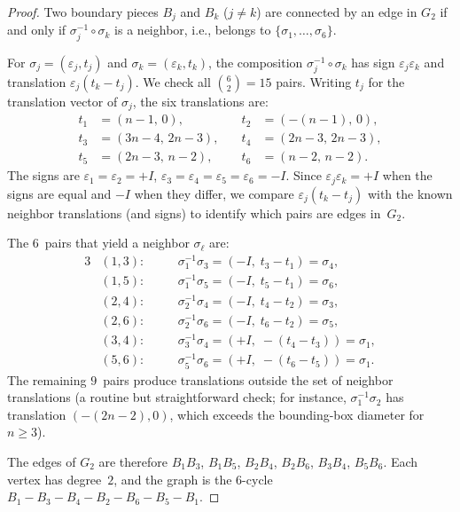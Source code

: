 \documentclass{amsart}
\theoremstyle{definition}
\theoremstyle{remark}
\begin{document}
\begin{proof}
Two boundary pieces $B_j$ and $B_k$ ($j \ne k$) are connected by an
edge in $G_2$ if and only if $\sigma_j^{-1} \circ \sigma_k$ is a
neighbor, i.e., belongs to $\{\sigma_1, \ldots, \sigma_6\}$.

For $\sigma_j = (\varepsilon_j, t_j)$ and $\sigma_k = (\varepsilon_k, t_k)$,
the composition $\sigma_j^{-1} \circ \sigma_k$ has sign
$\varepsilon_j \varepsilon_k$ and translation
$\varepsilon_j(t_k - t_j)$.  We check all $\binom{6}{2} = 15$ pairs.
Writing $t_j$ for the translation vector of $\sigma_j$, the six
translations are:
\[
\begin{aligned}
  t_1 &= (n{-}1,\, 0), &\quad
  t_2 &= (-(n{-}1),\, 0), \\
  t_3 &= (3n{-}4,\, 2n{-}3), &\quad
  t_4 &= (2n{-}3,\, 2n{-}3), \\
  t_5 &= (2n{-}3,\, n{-}2), &\quad
  t_6 &= (n{-}2,\, n{-}2).
\end{aligned}
\]
The signs are $\varepsilon_1 = \varepsilon_2 = +I$,\;
$\varepsilon_3 = \varepsilon_4 = \varepsilon_5 = \varepsilon_6 = -I$.
Since $\varepsilon_j \varepsilon_k = +I$ when the signs are equal and
$-I$ when they differ, we compare $\varepsilon_j(t_k - t_j)$
with the known neighbor translations (and signs) to identify which
pairs are edges in~$G_2$.

The $6$~pairs that yield a neighbor $\sigma_\ell$ are:
\begin{alignat*}{3}
  &(1,3):&\quad &\sigma_1^{-1}\sigma_3 = (-I,\; t_3 - t_1) = \sigma_4,\\
  &(1,5):&\quad &\sigma_1^{-1}\sigma_5 = (-I,\; t_5 - t_1) = \sigma_6,\\
  &(2,4):&\quad &\sigma_2^{-1}\sigma_4 = (-I,\; t_4 - t_2) = \sigma_3,\\
  &(2,6):&\quad &\sigma_2^{-1}\sigma_6 = (-I,\; t_6 - t_2) = \sigma_5,\\
  &(3,4):&\quad &\sigma_3^{-1}\sigma_4 = (+I,\; -(t_4 - t_3)) = \sigma_1,\\
  &(5,6):&\quad &\sigma_5^{-1}\sigma_6 = (+I,\; -(t_6 - t_5)) = \sigma_1.
\end{alignat*}
The remaining $9$~pairs produce translations outside the set of
neighbor translations (a routine but straightforward check; for
instance, $\sigma_1^{-1}\sigma_2$ has translation $(-(2n{-}2),0)$,
which exceeds the bounding-box diameter for $n \ge 3$).

The edges of $G_2$ are therefore $B_1 B_3$,\; $B_1 B_5$,\; $B_2 B_4$,\;
$B_2 B_6$,\; $B_3 B_4$,\; $B_5 B_6$.\;  Each vertex has degree~$2$,
and the graph is the $6$-cycle
$B_1 - B_3 - B_4 - B_2 - B_6 - B_5 - B_1$.
\end{proof}
\end{document}
